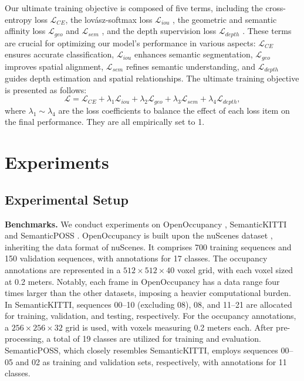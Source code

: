 \documentclass[10pt,twocolumn,letterpaper]{article}
\begin{document}
Our ultimate training objective is composed of five terms, including the cross-entropy loss $\mathcal{L}_{CE}$, the lovász-softmax loss $\mathcal{L}_{iou}$ \cite{jieli2020}, the geometric and semantic affinity loss $\mathcal{L}_{geo}$ and $\mathcal{L}_{sem}$ \cite{maximberman2020}, and the depth supervision loss $\mathcal{L}_{depth}$ \cite{albertgu2021}. These terms are crucial for optimizing our model's performance in various aspects: $\mathcal{L}_{CE}$ ensures accurate classification, $\mathcal{L}_{iou}$ enhances semantic segmentation, $\mathcal{L}_{geo}$ improves spatial alignment, $\mathcal{L}_{sem}$ refines semantic understanding, and $\mathcal{L}_{depth}$ guides depth estimation and spatial relationships. The ultimate training objective is presented as follows:
\begin{equation}
  \mathcal{L} = \mathcal{L}_{CE} + \lambda_1 \mathcal{L}_{iou} + \lambda_2 \mathcal{L}_{geo} + \lambda_3 \mathcal{L}_{sem} + \lambda_4 \mathcal{L}_{depth},
  \label{eq:total_loss}
\end{equation}
where $\lambda_1 \sim \lambda_4$ are the loss coefficients to balance the effect of each loss item on the final performance. They are all empirically set to 1.


\section{Experiments}

\subsection{Experimental Setup}

\textbf{Benchmarks.}
We conduct experiments on OpenOccupancy \cite{luisroldao}, SemanticKITTI \cite{jensbehley} and SemanticPOSS \cite{sourabhvora}. OpenOccupancy is built upon the nuScenes dataset \cite{siqili}, inheriting the data format of nuScenes. It comprises 700 training sequences and 150 validation sequences, with annotations for 17 classes. The occupancy annotations are represented in a $512 \times 512 \times 40$ voxel grid, with each voxel sized at 0.2 meters. Notably, each frame in OpenOccupancy has a data range four times larger than the other datasets, imposing a heavier computational burden. In SemanticKITTI, sequences 00--10 (excluding 08), 08, and 11--21 are allocated for training, validation, and testing, respectively. For the occupancy annotations, a $256 \times 256 \times 32$ grid is used, with voxels measuring 0.2 meters each. After pre-processing, a total of 19 classes are utilized for training and evaluation. SemanticPOSS, which closely resembles SemanticKITTI, employs sequences 00--05 and 02 as training and validation sets, respectively, with annotations for 11 classes.
\end{document}
